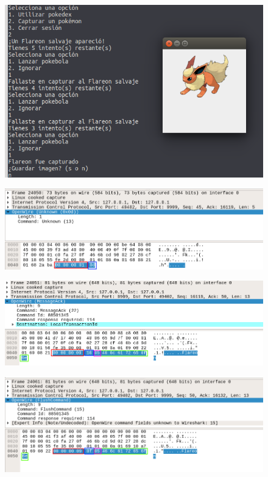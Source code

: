 \documentclass[12pt]{article}
\begin{document}
\begin{figure}[H]
  \centering
  \includegraphics[width=\textwidth]{14}
  \caption{}
\end{figure}

\begin{figure}[H]
  \centering
  \includegraphics[width=\textwidth]{15}
  \caption{}
\end{figure}

\begin{figure}[H]
  \centering
  \includegraphics[width=\textwidth]{16}
  \caption{}
\end{figure}

\begin{figure}[H]
  \centering
  \includegraphics[width=\textwidth]{17}
  \caption{}
\end{figure}
\end{document}
